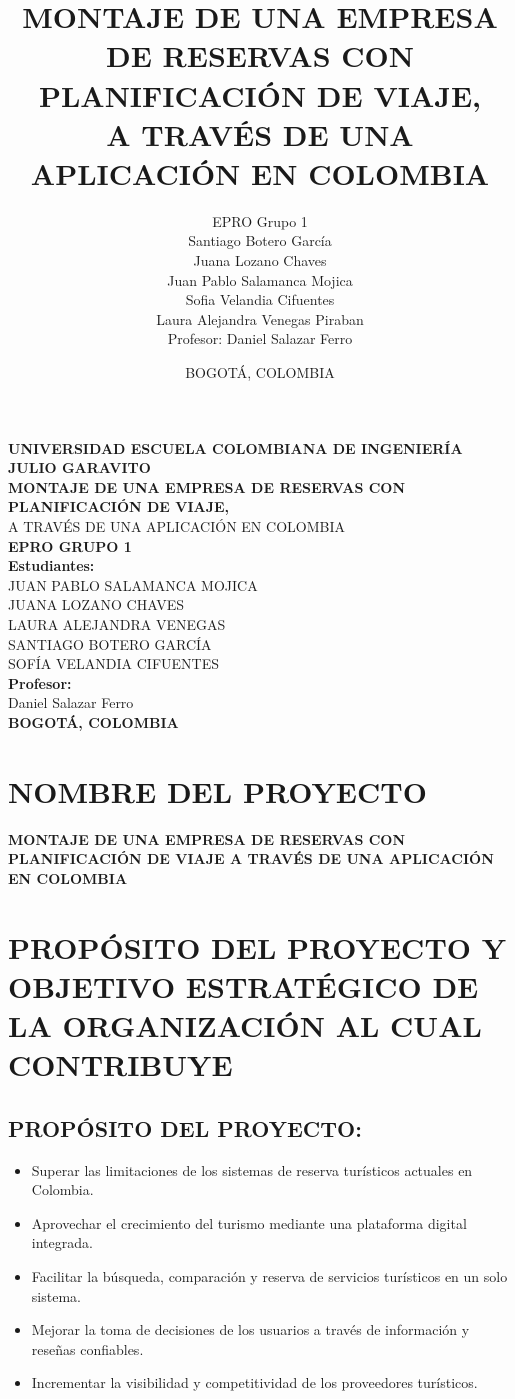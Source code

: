 \documentclass[12pt,a4paper]{article}
\title{\textbf{MONTAJE DE UNA EMPRESA DE RESERVAS CON PLANIFICACIÓN DE VIAJE,}\\
A TRAVÉS DE UNA APLICACIÓN EN COLOMBIA}
\author{EPRO Grupo 1\\
    \small Santiago Botero García\\
    \small Juana Lozano Chaves\\
    \small Juan Pablo Salamanca Mojica\\
    \small Sofia Velandia Cifuentes\\
    \small Laura Alejandra Venegas Piraban\\
    \vspace{0.5cm}
    \small Profesor: Daniel Salazar Ferro}
\date{BOGOTÁ, COLOMBIA}
\newcommand{\sectiontitle}[1]{\section{#1}}
\newcommand{\subsectiontitle}[1]{\subsection{#1}}
\begin{document}
\begin{titlepage}
    \centering
    \vspace*{2cm}
    
    {\Large\textbf{UNIVERSIDAD ESCUELA COLOMBIANA DE INGENIERÍA JULIO GARAVITO}}\\[1cm]
    
    {\Large\textbf{MONTAJE DE UNA EMPRESA DE RESERVAS CON PLANIFICACIÓN DE VIAJE,}}\\[0.3cm]
    {\Large A TRAVÉS DE UNA APLICACIÓN EN COLOMBIA}\\[2cm]
    
    {\large\textbf{EPRO GRUPO 1}}\\[1.5cm]
    
    \textbf{Estudiantes:}\\[0.5cm]
    JUAN PABLO SALAMANCA MOJICA\\
    JUANA LOZANO CHAVES\\
    LAURA ALEJANDRA VENEGAS\\
    SANTIAGO BOTERO GARCÍA\\
    SOFÍA VELANDIA CIFUENTES\\[1.5cm]
    
    \textbf{Profesor:}\\[0.5cm]
    Daniel Salazar Ferro\\[2cm]
    
    \textbf{BOGOTÁ, COLOMBIA}
    
    \vfill
\end{titlepage}

\tableofcontents
\newpage

\sectiontitle{NOMBRE DEL PROYECTO}

\textbf{MONTAJE DE UNA EMPRESA DE RESERVAS CON PLANIFICACIÓN DE VIAJE A TRAVÉS DE UNA APLICACIÓN EN COLOMBIA}

\sectiontitle{PROPÓSITO DEL PROYECTO Y OBJETIVO ESTRATÉGICO DE LA ORGANIZACIÓN AL CUAL CONTRIBUYE}

\subsectiontitle{PROPÓSITO DEL PROYECTO:}

\begin{itemize}
    \item Superar las limitaciones de los sistemas de reserva turísticos actuales en Colombia.
    \item Aprovechar el crecimiento del turismo mediante una plataforma digital integrada.
    \item Facilitar la búsqueda, comparación y reserva de servicios turísticos en un solo sistema.
    \item Mejorar la toma de decisiones de los usuarios a través de información y reseñas confiables.
    \item Incrementar la visibilidad y competitividad de los proveedores turísticos.
\end{itemize}
\end{document}
